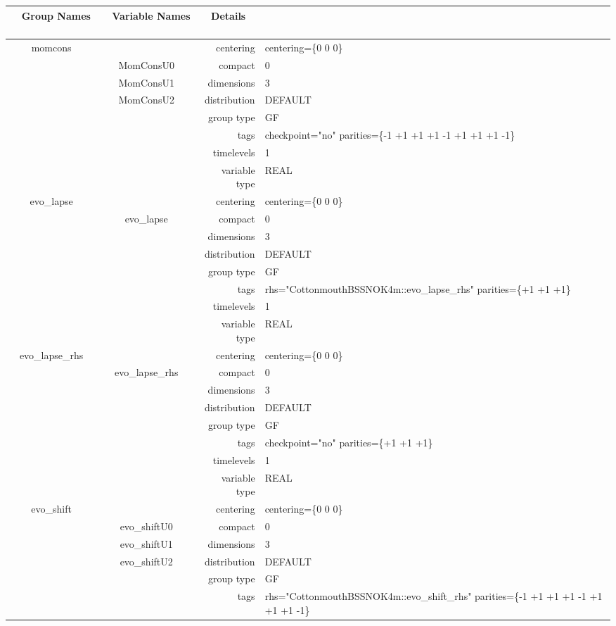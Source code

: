 \documentclass{article}
\begin{document}
\begin{tabular*}{150mm}{|c|c@{\extracolsep{\fill}}|rl|} \hline 
~ {\bf Group Names} ~ & ~ {\bf Variable Names} ~  &{\bf Details} ~ & ~ \\ 
\hline 
momcons &  & centering & centering=\{0 0 0\} \\ 
 & MomConsU0 & compact & 0 \\ 
 & MomConsU1 & dimensions & 3 \\ 
 & MomConsU2 & distribution & DEFAULT \\ 
 &  & group type & GF \\ 
 &  & tags & checkpoint="no" parities=\{-1 +1 +1  +1 -1 +1  +1 +1 -1\} \\ 
 &  & timelevels & 1 \\ 
 &  & variable type & REAL \\ 
\hline 
evo\_lapse &  & centering & centering=\{0 0 0\} \\ 
 & evo\_lapse & compact & 0 \\ 
 &  & dimensions & 3 \\ 
 &  & distribution & DEFAULT \\ 
 &  & group type & GF \\ 
 &  & tags & rhs="CottonmouthBSSNOK4m::evo\_lapse\_rhs" parities=\{+1 +1 +1\} \\ 
 &  & timelevels & 1 \\ 
 &  & variable type & REAL \\ 
\hline 
evo\_lapse\_rhs &  & centering & centering=\{0 0 0\} \\ 
 & evo\_lapse\_rhs & compact & 0 \\ 
 &  & dimensions & 3 \\ 
 &  & distribution & DEFAULT \\ 
 &  & group type & GF \\ 
 &  & tags & checkpoint="no" parities=\{+1 +1 +1\} \\ 
 &  & timelevels & 1 \\ 
 &  & variable type & REAL \\ 
\hline 
evo\_shift &  & centering & centering=\{0 0 0\} \\ 
 & evo\_shiftU0 & compact & 0 \\ 
 & evo\_shiftU1 & dimensions & 3 \\ 
 & evo\_shiftU2 & distribution & DEFAULT \\ 
 &  & group type & GF \\ 
 &  & tags & rhs="CottonmouthBSSNOK4m::evo\_shift\_rhs" parities=\{-1 +1 +1  +1 -1 +1  +1 +1 -1\} \\ 

\end{tabular*}
\end{document}
